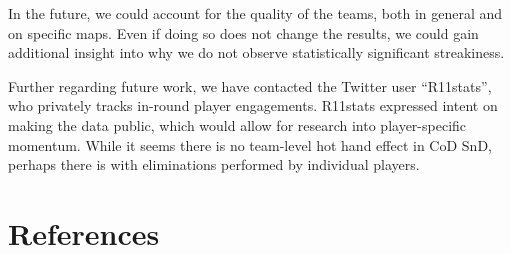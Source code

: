 \documentclass{article}
\begin{document}
In the future, we could account for the quality of the teams, both in
general and on specific maps. Even if doing so does not change the
results, we could gain additional insight into why we do not observe
statistically significant streakiness.

Further regarding future work, we have contacted the Twitter user
``R11stats'', who privately tracks in-round player engagements. R11stats
expressed intent on making the data public, which would allow for
research into player-specific momentum. While it seems there is no
team-level hot hand effect in CoD SnD, perhaps there is with
eliminations performed by individual players.

\hypertarget{references}{%
\section*{References}\label{references}}
\end{document}
